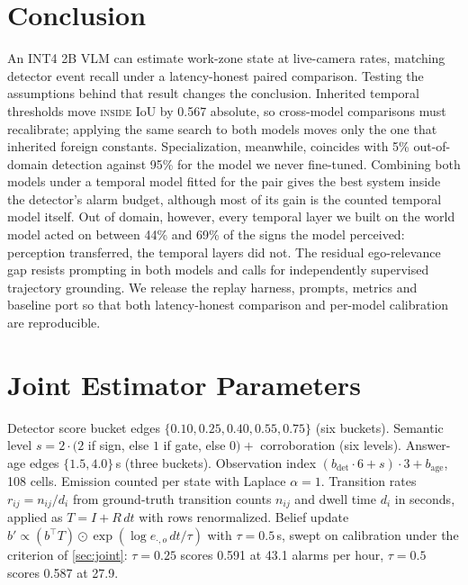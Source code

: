 \documentclass[journal]{IEEEtran}
\begin{document}
\section{Conclusion}
\label{sec:conclusion}

An INT4 2B VLM can estimate work-zone state at live-camera rates, matching detector event recall under a latency-honest paired comparison.  Testing the assumptions behind that result changes the conclusion.  Inherited temporal thresholds move \textsc{inside} IoU by 0.567 absolute, so cross-model comparisons must recalibrate; applying the same search to both models moves only the one that inherited foreign constants.  Specialization, meanwhile, coincides with 5\% out-of-domain detection against 95\% for the model we never fine-tuned.  Combining both models under a temporal model fitted for the pair gives the best system inside the detector's alarm budget, although most of its gain is the counted temporal model itself.  Out of domain, however, every temporal layer we built on the world model acted on between 44\% and 69\% of the signs the model perceived: perception transferred, the temporal layers did not.  The residual ego-relevance gap resists prompting in both models and calls for independently supervised trajectory grounding.  We release the replay harness, prompts, metrics and baseline port so that both latency-honest comparison and per-model calibration are reproducible.

\appendices

\section{Joint Estimator Parameters}
\label{app:joint}

Detector score bucket edges $\{0.10, 0.25, 0.40, 0.55, 0.75\}$ (six buckets).  Semantic level $s = 2\cdot(2$ if sign, else $1$ if gate, else $0) +$ corroboration (six levels).  Answer-age edges $\{1.5, 4.0\}$\,s (three buckets).  Observation index $(b_\text{det}\cdot 6 + s)\cdot 3 + b_\text{age}$, 108 cells.  Emission counted per state with Laplace $\alpha = 1$.  Transition rates $r_{ij} = n_{ij}/d_i$ from ground-truth transition counts $n_{ij}$ and dwell time $d_i$ in seconds, applied as $T = I + R\,dt$ with rows renormalized.  Belief update $b' \propto (b^\top T) \odot \exp(\log e_{\cdot,o}\, dt/\tau)$ with $\tau = 0.5$\,s, swept on calibration under the criterion of \cref{sec:joint}: $\tau = 0.25$ scores 0.591 at 43.1 alarms per hour, $\tau = 0.5$ scores 0.587 at 27.9.



\end{document}
